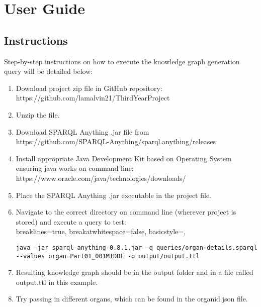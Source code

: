 \chapter{User Guide}
\section{Instructions}
Step-by-step instructions on how to execute the knowledge graph generation query will be detailed below:

\begin{enumerate}
    \item Download project zip file in GitHub repository: \\ https://github.com/lamalvin21/ThirdYearProject
    \item Unzip the file.
    \item Download SPARQL Anything .jar file from \\ https://github.com/SPARQL-Anything/sparql.anything/releases
    \item Install appropriate Java Development Kit based on Operating System ensuring java works on command line: \\ https://www.oracle.com/java/technologies/downloads/
    \item Place the SPARQL Anything .jar executable in the project file.
    \item Navigate to the correct directory on command line (wherever project is stored) and execute a query to test: \\ 
\vspace{-0.4cm}
\lstset
{
    breaklines=true,
    breakatwhitespace=false,
    basicstyle=\linespread{1}\ttfamily,
}
\begin{lstlisting}
java -jar sparql-anything-0.8.1.jar -q queries/organ-details.sparql --values organ=Part01_001MIDDE -o output/output.ttl
\end{lstlisting}
\vspace{-0.25cm}
    \item Resulting knowledge graph should be in the output folder and in a file called output.ttl in this example.
    \item Try passing in different organs, which can be found in the organid.json file.
\end{enumerate}

